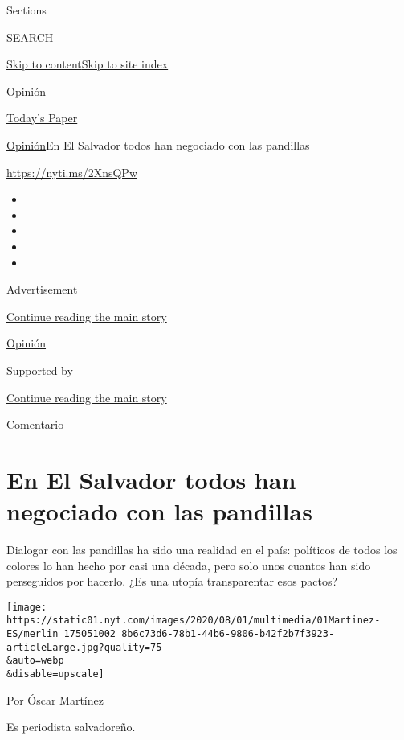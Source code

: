 Sections

SEARCH

\protect\hyperlink{site-content}{Skip to
content}\protect\hyperlink{site-index}{Skip to site index}

\href{https://www.nytimes.com/es/section/opinion}{Opinión}

\href{https://myaccount.nytimes.com/auth/login?response_type=cookie\&client_id=vi}{}

\href{https://www.nytimes.com/section/todayspaper}{Today's Paper}

\href{/es/section/opinion}{Opinión}\textbar{}En El Salvador todos han
negociado con las pandillas

\url{https://nyti.ms/2XnsQPw}

\begin{itemize}
\item
\item
\item
\item
\item
\end{itemize}

Advertisement

\protect\hyperlink{after-top}{Continue reading the main story}

\href{/es/section/opinion}{Opinión}

Supported by

\protect\hyperlink{after-sponsor}{Continue reading the main story}

Comentario

\hypertarget{en-el-salvador-todos-han-negociado-con-las-pandillas}{%
\section{En El Salvador todos han negociado con las
pandillas}\label{en-el-salvador-todos-han-negociado-con-las-pandillas}}

Dialogar con las pandillas ha sido una realidad en el país: políticos de
todos los colores lo han hecho por casi una década, pero solo unos
cuantos han sido perseguidos por hacerlo. ¿Es una utopía transparentar
esos pactos?

\texttt{[image: https://static01.nyt.com/images/2020/08/01/multimedia/01Martinez-ES/merlin\_175051002\_8b6c73d6-78b1-44b6-9806-b42f2b7f3923-articleLarge.jpg?quality=75\\\&auto=webp\\\&disable=upscale]}

Por Óscar Martínez

Es periodista salvadoreño.

